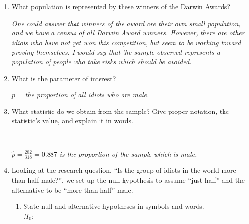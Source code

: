 \begin{enumerate}
   \item  What population is  represented by these winners of the
     Darwin Awards?
\begin{students}
    \vspace{1.6cm}    
\end{students}
\begin{key}
  {\it One could answer that winners of the award are their own small
    population, and we have a census of all Darwin Award
    winners. However, there are other idiots who have not yet won this
    competition, but seem to be working toward proving themselves. I
    would say that the sample observed represents a population of people who
    take risks which should be avoided.} 
\end{key}
   \item  What is the parameter of interest?
\begin{students}
    \vspace{1cm}    
\end{students}
\begin{key} 
  {\it $p$ = the proportion of all idiots who are male.}
\end{key}
  \item \label{MIT.phat} What statistic do we obtain from the sample?
    Give proper notation, the statistic's value, and explain it in words.
\begin{students}
    \vspace*{2cm}    \\
\end{students}
\begin{key} 
   { $\widehat{p} = \frac{282}{318} = 0.887$ \it is the
    proportion of the sample which is male.}
\end{key}
\item Looking at the research question, ``Is the group of idiots in the world
  more than half male?'',   we set
  up the null hypothesis to assume ``just half'' and the alternative to be
  ``more than half'' male.
    \begin{enumerate}
    \item State null and alternative hypotheses in symbols and
      words.\\
      $H_0:$ 
\begin{students}
    \vspace{1.5cm}    \\
\end{students}
\begin{key} 

\end{key}
\end{enumerate}
\end{enumerate}
